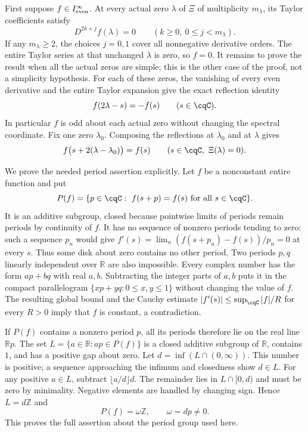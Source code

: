 First suppose $f\in I_{\rm even}^{\infty}$. At every actual
zero $\lambda$ of $\Xi$ of multiplicity $m_\lambda$, its
Taylor coefficients satisfy
\[
 D^{2k+j}f(\lambda)=0
 \qquad(k\geq0,\ 0\leq j<m_\lambda).
\]
If any $m_\lambda\geq2$, the choices $j=0,1$ cover all
nonnegative derivative orders. The entire Taylor series at that
unchanged $\lambda$ is zero, so $f=0$. It remains to prove
the result when all the actual zeros are simple; this is the
other case of the proof, not a simplicity hypothesis.
For each of these zeros, the vanishing of every even derivative
and the entire Taylor expansion give the exact reflection identity
\begin{equation}\label{eq:cq-heat-core-reflections}
 f(2\lambda-s)=-f(s)\qquad(s\in\cqC).
\end{equation}
In particular $f$ is odd about each actual zero without changing
the spectral coordinate. Fix one zero $\lambda_0$.
Composing the reflections at $\lambda_0$ and at $\lambda$ gives
\begin{equation}\label{eq:cq-heat-core-periods}
 f\bigl(s+2(\lambda-\lambda_0)\bigr)=f(s)
 \qquad(s\in\cqC,\ \Xi(\lambda)=0).
\end{equation}

We prove the needed period assertion explicitly. Let $f$ be a
nonconstant entire function and put
\[
 P(f)=\{p\in\cqC:\ f(s+p)=f(s)\text{ for all }s\in\cqC\}.
\]
It is an additive subgroup, closed because pointwise limits of
periods remain periods by continuity of $f$. It has no sequence
of nonzero periods tending to zero: such a sequence $p_n$ would
give
$f'(s)=\lim_n(f(s+p_n)-f(s))/p_n=0$ at every $s$.
Thus some disk about zero contains no other period.
Two periods $p,q$ linearly independent over $\mathbb R$ are
also impossible. Every complex number has the form $ap+bq$
with real $a,b$. Subtracting the integer parts of $a,b$
puts it in the compact parallelogram
$\{xp+yq:0\leq x,y\leq1\}$ without changing the value of $f$.
The resulting global bound and the Cauchy estimate
$|f'(s)|\leq\sup_{\cqC}|f|/R$ for every $R>0$ imply that
$f$ is constant, a contradiction.

If $P(f)$ contains a nonzero period $p$, all its periods
therefore lie on the real line $\mathbb Rp$. The set
$L=\{a\in\mathbb R:ap\in P(f)\}$ is a closed additive subgroup
of $\mathbb R$, contains $1$, and has a positive gap about zero.
Let $d=\inf(L\cap(0,\infty))$. This number is positive; a
sequence approaching the infimum and closedness show $d\in L$.
For any positive $a\in L$, subtract
$\lfloor a/d\rfloor d$. The remainder lies in $L\cap[0,d)$
and must be zero by minimality. Negative elements are handled
by changing sign. Hence $L=d\mathbb Z$ and
\[
 P(f)=\omega\mathbb Z,\qquad\omega=dp\ne0.
\]
This proves the full assertion about the period group used here.

